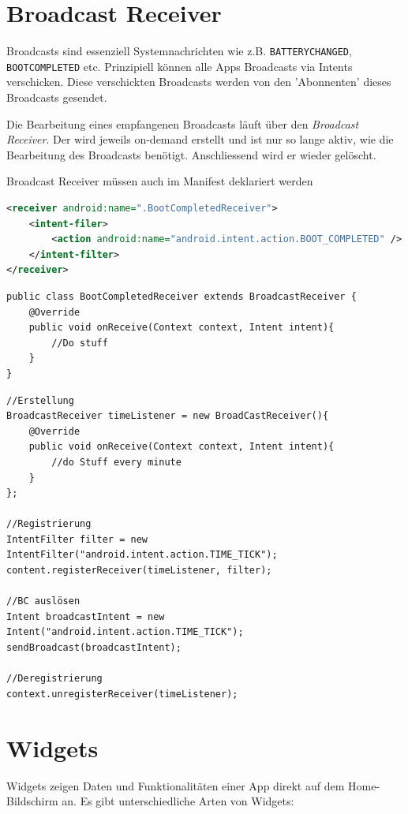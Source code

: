 \documentclass[a4paper, 11pt]{article}
\newcommand{\code}[1]{\texttt{#1}}
\begin{document}
\section{Broadcast Receiver}
Broadcasts sind essenziell Systemnachrichten wie z.B. \code{BATTERY\textunderscore CHANGED}, \code{BOOT\textunderscore COMPLETED} etc. Prinzipiell können alle Apps Broadcasts via Intents verschicken. Diese verschickten Broadcasts werden von den 'Abonnenten' dieses Broadcasts gesendet.
\vspace{10px}

\noindent Die Bearbeitung eines empfangenen Broadcasts läuft über den \textit{Broadcast Receiver}. Der wird jeweils on-demand erstellt und ist nur so lange aktiv, wie die Bearbeitung des Broadcasts benötigt. Anschliessend wird er wieder gelöscht. 
\vspace{10px}

\noindent Broadcast Receiver müssen auch im Manifest deklariert werden

\begin{lstlisting}[language=xml, caption={BR-Deklaration im Android Manifest}]
<receiver android:name=".BootCompletedReceiver">
	<intent-filer>
		<action android:name="android.intent.action.BOOT_COMPLETED" />
	</intent-filter>
</receiver>
\end{lstlisting}

\begin{lstlisting}[caption={Implementierung eines BR}]
public class BootCompletedReceiver extends BroadcastReceiver {
	@Override
	public void onReceive(Context context, Intent intent){
		//Do stuff
	}
}
\end{lstlisting}

\begin{lstlisting}[caption={Erstellung, Auslösen, Registrierung und Deregistrierung vonv einem BR}]
//Erstellung
BroadcastReceiver timeListener = new BroadCastReceiver(){
	@Override
	public void onReceive(Context context, Intent intent){
		//do Stuff every minute
	}
};

//Registrierung
IntentFilter filter = new IntentFilter("android.intent.action.TIME_TICK");
content.registerReceiver(timeListener, filter);

//BC auslösen
Intent broadcastIntent = new Intent("android.intent.action.TIME_TICK");
sendBroadcast(broadcastIntent);

//Deregistrierung
context.unregisterReceiver(timeListener);
\end{lstlisting}

\section{Widgets}
Widgets zeigen Daten und Funktionalitäten einer App direkt auf dem Home-Bildschirm an. Es gibt unterschiedliche Arten von Widgets:
\end{document}
